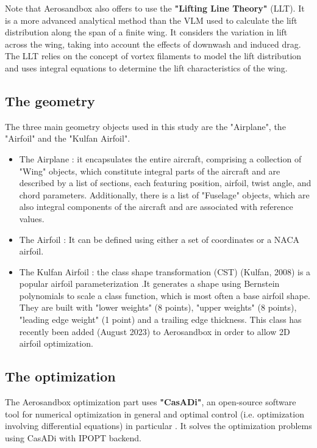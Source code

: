 Note that Aerosandbox also offers to use the \textbf{"Lifting Line Theory"} (LLT). It is a more advanced analytical method than the VLM used to calculate the lift distribution along the span of a finite wing. It considers the variation in lift across the wing, taking into account the effects of downwash and induced drag. The LLT relies on the concept of vortex filaments to model the lift distribution and uses integral equations to determine the lift characteristics of the wing.

\subsection{The geometry}
\label{sub:Ch2.1.3}

The three main geometry objects used in this study are the "Airplane", the "Airfoil" and the "Kulfan Airfoil".

\begin{itemize}
    \item The Airplane : it encapsulates the entire aircraft, comprising a collection of "Wing" objects, which constitute integral parts of the aircraft and are described by a list of sections, each featuring position, airfoil, twist angle, and chord parameters. Additionally, there is a list of "Fuselage" objects, which are also integral components of the aircraft and are associated with reference values.
    \item The Airfoil : It can be defined using either a set of coordinates or a NACA airfoil.
    \item The Kulfan Airfoil : the class shape transformation (CST) (Kulfan, 2008) is a popular airfoil parameterization \cite{Kulfan}.It generates a shape using Bernstein polynomials to scale a class function, which is most often a base airfoil shape. They are built with "lower weights" (8 points), "upper weights" (8 points), "leading edge weight" (1 point) and a trailing edge thickness. This class has recently been added (August 2023) to Aerosandbox in order to allow 2D airfoil optimization.   
\end{itemize}

\subsection{The optimization}
\label{sub:Ch2.1.4}

The Aerosandbox optimization part uses \textbf{"CasADi"}, an open-source software tool for numerical optimization in general and optimal control (i.e. optimization involving differential equations) in particular \cite{Andersson2018}. It solves the optimization problems using CasADi with IPOPT backend. 

